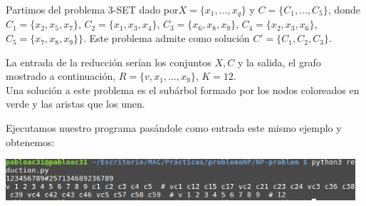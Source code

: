 \documentclass[a4paper, 11pt]{article}
\begin{document}
Partimos del problema 3-SET dado por$X=\{x_1,\dots,x_q\}$ y $C=\{C_1,\dots,C_5\}$, donde $C_1=\{x_2, x_5, x_7\}$, $C_2=\{x_1,x_3,x_4\}$, $C_3=\{x_6,x_8,x_9\}$, $C_4=\{x_2,x_3,x_6\}$, $C_5=\{x_7,x_8,x_9\}\}$. Este problema admite como solución $C'=\{C_1,C_2,C_3\}$.

La entrada de la reducción serían los conjuntos $X, C$ y la salida, el grafo mostrado a continuación, $R=\{v,x_1,\dots,x_9\}$, $K=12$.\\



Una solución a este problema es el subárbol formado por los nodos coloreados en verde y las aristas que los unen.

Ejecutamos nuestro programa pasándole como entrada este mismo ejemplo y obtenemos:

\includegraphics[width=13cm]{imagen}
\end{document}

